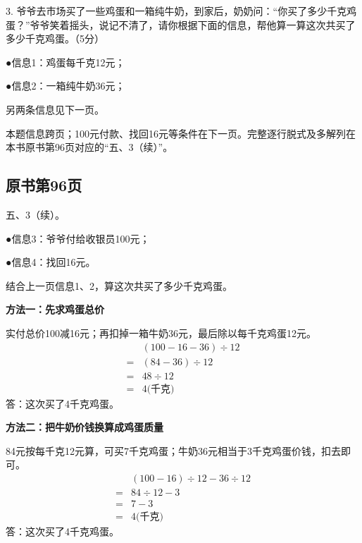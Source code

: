 3. 爷爷去市场买了一些鸡蛋和一箱纯牛奶，到家后，奶奶问：“你买了多少千克鸡蛋？”爷爷笑着摇头，说记不清了，请你根据下面的信息，帮他算一算这次共买了多少千克鸡蛋。（5分）\par ●信息1：鸡蛋每千克12元；\par ●信息2：一箱纯牛奶36元；\par 另两条信息见下一页。\par
\begin{BookAnswer}
本题信息跨页；100元付款、找回16元等条件在下一页。完整逐行脱式及多解列在本书原书第96页对应的“五、3（续）”。
\end{BookAnswer}



\subsection*{原书第96页}

五、3（续）。\par ●信息3：爷爷付给收银员100元；\par ●信息4：找回16元。\par 结合上一页信息1、2，算这次共买了多少千克鸡蛋。\par
\begin{BookAnswer}
\textbf{方法一：先求鸡蛋总价}\par 实付总价100减16元；再扣掉一箱牛奶36元，最后除以每千克鸡蛋12元。\[\begin{aligned} &(100-16-36)\div12\\ ={}&(84-36)\div12\\ ={}&48\div12\\ ={}&4\text{(千克)}\end{aligned}\]答：这次买了4千克鸡蛋。\par \textbf{方法二：把牛奶价钱换算成鸡蛋质量}\par 84元按每千克12元算，可买7千克鸡蛋；牛奶36元相当于3千克鸡蛋价钱，扣去即可。\[\begin{aligned} &(100-16)\div12-36\div12\\ ={}&84\div12-3\\ ={}&7-3\\ ={}&4\text{(千克)}\end{aligned}\]答：这次买了4千克鸡蛋。\par
\end{BookAnswer}

